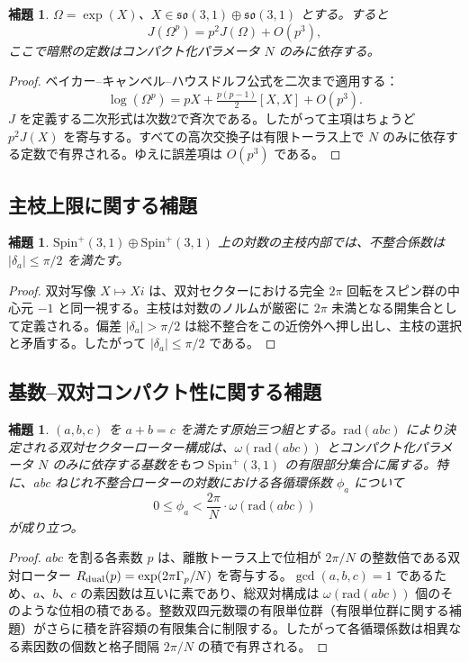 \documentclass[dvipdfmx,a4paper]{article}
\newtheorem{lemma}[theorem]{補題}
\theoremstyle{definition}
\theoremstyle{remark}
\begin{document}
\begin{lemma}
$\Omega = \exp(X)$、$X \in \mathfrak{so}(3,1) \oplus \mathfrak{so}(3,1)$ とする。すると
\[
J(\Omega^p) = p^2 J(\Omega) + O(p^3),
\]
ここで暗黙の定数はコンパクト化パラメータ $N$ のみに依存する。
\end{lemma}

\begin{proof}
ベイカー--キャンベル--ハウスドルフ公式を二次まで適用する：
\[
\log(\Omega^p) = pX + \tfrac{p(p-1)}{2}[X,X] + O(p^3).
\]
$J$ を定義する二次形式は次数2で斉次である。したがって主項はちょうど $p^2 J(X)$ を寄与する。すべての高次交換子は有限トーラス上で $N$ のみに依存する定数で有界される。ゆえに誤差項は $O(p^3)$ である。
\end{proof}

\subsection{主枝上限に関する補題}

\begin{lemma}
$\mathrm{Spin}^+(3,1) \oplus \mathrm{Spin}^+(3,1)$ 上の対数の主枝内部では、不整合係数は $|\delta_a| \leq \pi/2$ を満たす。
\end{lemma}

\begin{proof}
双対写像 $X \mapsto Xi$ は、双対セクターにおける完全 $2\pi$ 回転をスピン群の中心元 $-1$ と同一視する。主枝は対数のノルムが厳密に $2\pi$ 未満となる開集合として定義される。偏差 $|\delta_a| > \pi/2$ は総不整合をこの近傍外へ押し出し、主枝の選択と矛盾する。したがって $|\delta_a| \leq \pi/2$ である。
\end{proof}

\subsection{基数--双対コンパクト性に関する補題}
\label{lem:radical-dual-ja}

\begin{lemma}
$(a,b,c)$ を $a + b = c$ を満たす原始三つ組とする。$\mathrm{rad}(abc)$ により決定される双対セクターローター構成は、$\omega(\mathrm{rad}(abc))$ とコンパクト化パラメータ $N$ のみに依存する基数をもつ $\mathrm{Spin}^+(3,1)$ の有限部分集合に属する。特に、abc ねじれ不整合ローターの対数における各循環係数 $\phi_a$ について
\[
0 \leq \phi_a < \frac{2\pi}{N} \cdot \omega(\mathrm{rad}(abc))
\]
が成り立つ。
\end{lemma}

\begin{proof}
$abc$ を割る各素数 $p$ は、離散トーラス上で位相が $2\pi/N$ の整数倍である双対ローター $R_{\rm dual}(p) = \exp(2\pi \Gamma_p / N)$ を寄与する。$\gcd(a,b,c) = 1$ であるため、$a$、$b$、$c$ の素因数は互いに素であり、総双対構成は $\omega(\mathrm{rad}(abc))$ 個のそのような位相の積である。整数双四元数環の有限単位群（有限単位群に関する補題）がさらに積を許容類の有限集合に制限する。したがって各循環係数は相異なる素因数の個数と格子間隔 $2\pi/N$ の積で有界される。
\end{proof}
\end{document}
